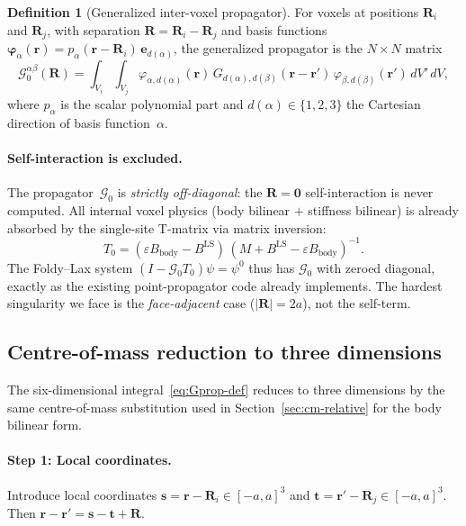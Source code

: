 \documentclass[11pt,a4paper]{article}
\newcommand{\bs}{\bm{s}}
\newcommand{\br}{\bm{r}}
\newcommand{\bphi}{\bm{\varphi}}
\newcommand{\BLS}{B^{\mathrm{LS}}}
\newcommand{\bR}{\bm{R}}
\newcommand{\bt}{\bm{t}}
\newcommand{\Gprop}{\mathcal{G}_0}
\theoremstyle{plain}
\theoremstyle{definition}
\newtheorem{definition}[theorem]{Definition}
\theoremstyle{remark}
\begin{document}
\begin{definition}[Generalized inter-voxel propagator]
For voxels at positions $\bR_i$ and $\bR_j$, with separation
$\bR = \bR_i - \bR_j$ and basis functions
$\bphi_\alpha(\br) = p_\alpha(\br - \bR_i)\,\bm{e}_{d(\alpha)}$,
the generalized propagator is the $N \times N$ matrix
\begin{equation}
  \Gprop^{\alpha\beta}(\bR)
  = \int_{V_i}\!\!\int_{V_j}\!
    \varphi_{\alpha,d(\alpha)}(\br)\,
    G_{d(\alpha),d(\beta)}(\br - \br')\,
    \varphi_{\beta,d(\beta)}(\br')\,dV'\,dV,
  \label{eq:Gprop-def}
\end{equation}
where $p_\alpha$ is the scalar polynomial part and $d(\alpha) \in
\{1,2,3\}$ the Cartesian direction of basis function~$\alpha$.
\end{definition}

\paragraph{Self-interaction is excluded.}
The propagator~$\Gprop$ is \emph{strictly off-diagonal}: the
$\bR = \bm{0}$ self-interaction is never computed.  All internal
voxel physics (body bilinear $+$ stiffness bilinear) is already
absorbed by the single-site T-matrix via matrix inversion:
\begin{equation}
  T_0 = (\varepsilon B_{\mathrm{body}} - \BLS)\,
        (M + \BLS - \varepsilon B_{\mathrm{body}})^{-1}.
  \label{eq:T0-self}
\end{equation}
The Foldy--Lax system $(I - \Gprop T_0)\psi = \psi^0$ thus has
$\Gprop$ with zeroed diagonal, exactly as the existing
point-propagator code already implements.  The hardest singularity
we face is the \emph{face-adjacent} case ($|\bR| = 2a$), not
the self-term.


\subsection{Centre-of-mass reduction to three dimensions}
\label{sec:cm-reduction-prop}

The six-dimensional integral~\eqref{eq:Gprop-def} reduces to three
dimensions by the same centre-of-mass substitution used in
Section~\ref{sec:cm-relative} for the body bilinear form.

\paragraph{Step 1: Local coordinates.}
Introduce local coordinates $\bs = \br - \bR_i \in [-a,a]^3$ and
$\bt = \br' - \bR_j \in [-a,a]^3$.  Then
$\br - \br' = \bs - \bt + \bR$.
\end{document}
